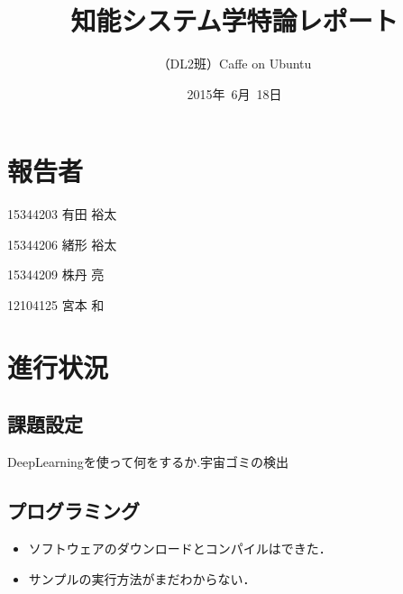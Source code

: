 \documentclass[a4paper,10pt]{jsarticle}
\title{知能システム学特論レポート}
\author{
（DL2班）Caffe on Ubuntu\\
}
\date{2015年\ 6月\ 18日}
\begin{document}
\section{報告者}
\begin{list}{}{}
 \item 15344203\hspace{0.5cm} 有田 裕太
 \item 15344206\hspace{0.5cm} 緒形 裕太
 \item 15344209\hspace{0.5cm} 株丹 亮
 \item 12104125\hspace{0.5cm} 宮本 和
\end{list}

\section{進行状況}
\subsection{課題設定}
DeepLearningを使って何をするか.宇宙ゴミの検出

\subsection{プログラミング}
\begin{itemize}
 \item ソフトウェアのダウンロードとコンパイルはできた．
 \item サンプルの実行方法がまだわからない．
\end{itemize}
\end{document}
